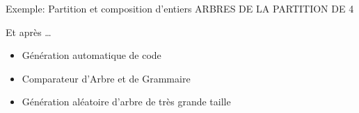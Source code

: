 \documentclass{beamer}
\begin{document}
\begin{frame}{Exemple: Partition et composition d'entiers}
ARBRES DE LA PARTITION DE 4
\end{frame}

\begin{frame}{Et après \ldots}
\begin{itemize}
\item Génération automatique de code
\item Comparateur d'Arbre et de Grammaire
\item Génération aléatoire d'arbre de très grande taille
\end{itemize}
\end{frame}

  


\end{document}
